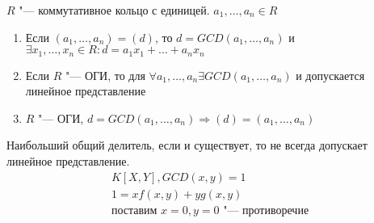 \begin{theorem}{}
	$R$ "--- коммутативное кольцо с единицей. $a_{1}, \dots, a_{n} \in R$
	\begin{enumerate}
		\item Если $\left(a_{1}, \dots, a_{n}\right) = \left(d\right)$, то $d = GCD\left(a_{1}, \dots, a_{n}\right)$ и 
		$\exists x_{1}, \dots, x_{n} \in R \colon d = a_{1}x_{1} + \dots + a_{n}x_{n}$
		\item Если $R$ "--- ОГИ, то для $\forall a_{1}, \dots, a_{n} \exists GCD\left(a_{1}, \dots, a_{n}\right)$ и
		допускается линейное представление
		\item $R$ "--- ОГИ, $d = GCD\left(a_{1}, \dots, a_{n}\right) \Rightarrow \left(d\right) = \left(a_{1}, \dots, a_{n}\right)$
	\end{enumerate}
\end{theorem}

\begin{Rem}
	Наибольший общий делитель, если и существует, то не всегда допускает линейное представление. 
	\begin{gather*}
		K\left[X, Y\right], GCD\left(x, y\right) = 1\\
		1 = xf\left(x, y\right) + yg\left(x, y\right)\\
		\text{поставим } x = 0, y = 0 \text{ "--- противоречие}
	\end{gather*}
\end{Rem}


